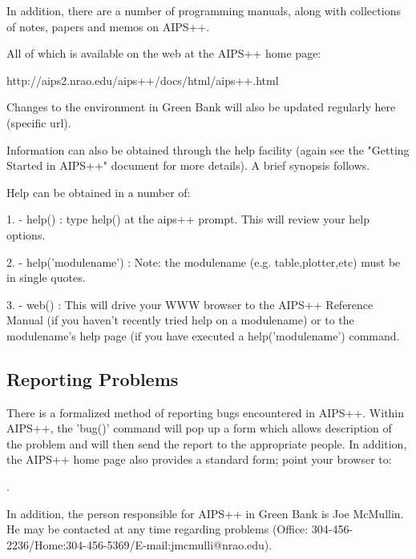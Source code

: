 In addition, there are a number of programming manuals, along with
collections of notes, papers and memos on AIPS++.
 
All of which is available on the web at the AIPS++ home page:
 
http://aips2.nrao.edu/aips++/docs/html/aips++.html

Changes to the environment in Green Bank will also be updated regularly
here (specific url).
 
Information can also be obtained through the help facility (again see the
"Getting Started in AIPS++" document for more details). A brief synopsis
follows.

Help can be obtained in a number of:
\begin{description}
\item{1.} - help() : type help() at the aips++ prompt. This will review your
	help options. 
\item{2.} - help('modulename') : Note: the modulename (e.g. table,plotter,etc)
		must be in single quotes.
\item{3.} - web() : This will drive your WWW browser to the AIPS++ Reference
	Manual (if you haven't recently tried help on a modulename) or to
	the modulename's help page (if you have executed a help('modulename')
	command.
\end{description}

\subsection{Reporting Problems}

There is a formalized method of reporting bugs encountered in AIPS++. 
Within AIPS++, the 'bug()' command will pop up a form which allows
description of the problem and will then send the report to the appropriate
people. In addition, the AIPS++ home page also provides a standard form;
point your browser to:

\begin{description}
\item{}.
\end{description}

In addition, the person responsible for AIPS++ in Green Bank is Joe McMullin.
He may be contacted at any time regarding problems (Office: 
304-456-2236/Home:304-456-5369/E-mail:jmcmulli@nrao.edu).



